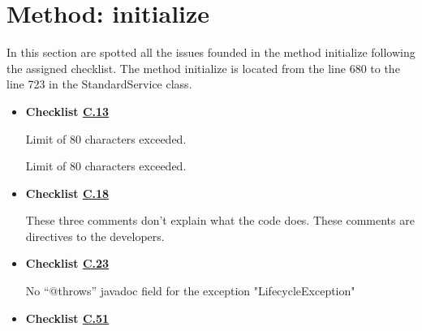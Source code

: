 \documentclass[../../../../codeInspection.tex]{subfiles}
\begin{document}
	\section{Method: initialize}

		In this section are spotted all the issues founded in the method initialize following the assigned checklist.
		The method initialize is located from the line 680 to the line 723 in the StandardService class.

		\begin{itemize}

			\item \textbf{Checklist \hyperref[C:13]{C.13}}

				  

				  Limit of 80 characters exceeded.

				  

				  Limit of 80 characters exceeded.

			\item \textbf{Checklist \hyperref[C:18]{C.18}}

				  

				  

				  

				  These three comments don't explain what the code does. These comments are directives to the developers.

			\item \textbf{Checklist \hyperref[C:23]{C.23}}

				  

				  No “@throws” javadoc field for the exception "LifecycleException"

			\item \textbf{Checklist \hyperref[C:51]{C.51}}

				  


\end{itemize}
\end{document}
